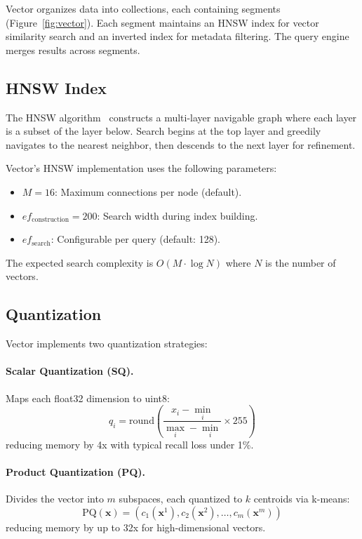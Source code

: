 \documentclass[11pt,twocolumn]{article}
\begin{document}
Vector organizes data into collections, each containing segments (Figure~\ref{fig:vector}). Each segment maintains an HNSW index for vector similarity search and an inverted index for metadata filtering. The query engine merges results across segments.

\subsection{HNSW Index}

The HNSW algorithm~\cite{malkov2018} constructs a multi-layer navigable graph where each layer is a subset of the layer below. Search begins at the top layer and greedily navigates to the nearest neighbor, then descends to the next layer for refinement.

Vector's HNSW implementation uses the following parameters:
\begin{itemize}
    \item $M = 16$: Maximum connections per node (default).
    \item $ef_{\text{construction}} = 200$: Search width during index building.
    \item $ef_{\text{search}}$: Configurable per query (default: 128).
\end{itemize}

The expected search complexity is $O(M \cdot \log N)$ where $N$ is the number of vectors.

\subsection{Quantization}

Vector implements two quantization strategies:

\paragraph{Scalar Quantization (SQ).} Maps each float32 dimension to uint8:
\begin{equation}
    q_i = \text{round}\left(\frac{x_i - \min_i}{\max_i - \min_i} \times 255\right)
\end{equation}
reducing memory by 4x with typical recall loss under 1\%.

\paragraph{Product Quantization (PQ).} Divides the vector into $m$ subspaces, each quantized to $k$ centroids via k-means:
\begin{equation}
    \text{PQ}(\mathbf{x}) = (c_1(\mathbf{x}^1), c_2(\mathbf{x}^2), \ldots, c_m(\mathbf{x}^m))
\end{equation}
reducing memory by up to 32x for high-dimensional vectors.
\end{document}
